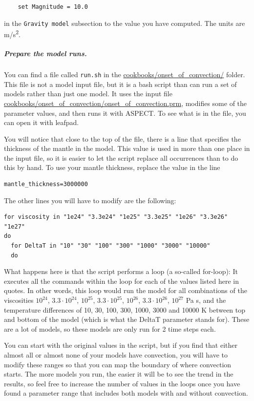\begin{verbatim}
    set Magnitude = 10.0
\end{verbatim}

in the \texttt{Gravity model} subsection to the value you have computed. The units are m/s\textsuperscript{2}. 

\subparagraph{Prepare the model runs.}

You can find a file called \texttt{run.sh} in the \url{cookbooks/onset_of_convection/} folder. 
This file is not a model input file, but it is a bash script than can run a set of models rather than just one model. 
It uses the input file \url{cookbooks/onset_of_convection/onset_of_convection.prm}, modifies some of the parameter values, 
and then runs it with ASPECT. To see what is in the file, you can open it with leafpad. 

You will notice that close to the top of the file, there is a line that specifies the thickness of the mantle in the model. 
This value is used in more than one place in the input file, so it is easier to let the script replace all occurrences than to do this by hand. To use your mantle thickness, replace the value in the line 

\begin{verbatim}
mantle_thickness=3000000
\end{verbatim}

The other lines you will have to modify are the following:

\begin{verbatim}
for viscosity in "1e24" "3.3e24" "1e25" "3.3e25" "1e26" "3.3e26" "1e27"
do
  for DeltaT in "10" "30" "100" "300" "1000" "3000" "10000"
  do   
\end{verbatim}

What happens here is that the script performs a loop (a so-called for-loop):
It executes all the commands within the loop for each of the values listed here in quotes. 
In other words, this loop would run the model for all combinations of the viscosities $10^{24}$, $3.3 \cdot 10^{24}$, $10^{25}$, $3.3 \cdot 10^{25}$, $10^{26}$, $3.3 \cdot 10^{26}$, $10^{27}$ Pa s, and the temperature differences of 10, 30, 100, 300, 1000, 3000 and 10000 K between top and bottom of the model (which is what the DeltaT parameter stands for). 
These are a lot of models, so these models are only run for 2 time steps each. 

You can start with the original values in the script, but if you find that either almost all or almost none of your models have convection, you will have to modify these ranges so that you can map the boundary of where convection starts. 
The more models you run, the easier it will be to see the trend in the results, so feel free to increase the number of values in the loops once you have found a parameter range that includes both models with and without convection.  

